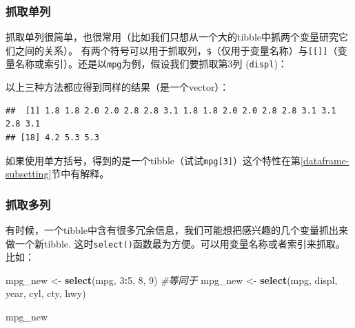 \documentclass[]{book}
\newenvironment{Shaded}{\begin{snugshade}}{\end{snugshade}}
\newcommand{\CommentTok}[1]{\textcolor[rgb]{0.56,0.35,0.01}{\textit{#1}}}
\newcommand{\DecValTok}[1]{\textcolor[rgb]{0.00,0.00,0.81}{#1}}
\newcommand{\KeywordTok}[1]{\textcolor[rgb]{0.13,0.29,0.53}{\textbf{#1}}}
\newcommand{\NormalTok}[1]{#1}
\newcommand{\OperatorTok}[1]{\textcolor[rgb]{0.81,0.36,0.00}{\textbf{#1}}}
\newcommand{\StringTok}[1]{\textcolor[rgb]{0.31,0.60,0.02}{#1}}
\begin{document}
\hypertarget{single-column}{%
\subsubsection{抓取单列}\label{single-column}}

抓取单列很简单，也很常用（比如我们只想从一个大的tibble中抓两个变量研究它们之间的关系）。 有两个符号可以用于抓取列，\texttt{\$}（仅用于变量名称）与\texttt{{[}{[}{]}{]}}（变量名称或索引）。还是以\texttt{mpg}为例，假设我们要抓取第3列 (\texttt{displ})：

\begin{Shaded}
\end{Shaded}

以上三种方法都应得到同样的结果（是一个vector）：

\begin{verbatim}
##  [1] 1.8 1.8 2.0 2.0 2.8 2.8 3.1 1.8 1.8 2.0 2.0 2.8 2.8 3.1 3.1 2.8 3.1
## [18] 4.2 5.3 5.3
\end{verbatim}

如果使用单方括号，得到的是一个tibble（试试\texttt{mpg{[}3{]}}）这个特性在第\ref{dataframe-subsetting}节中有解释。

\subsubsection{抓取多列}

有时候，一个tibble中含有很多冗余信息，我们可能想把感兴趣的几个变量抓出来做一个新tibble. 这时\texttt{select()}函数最为方便。可以用变量名称或者索引来抓取。比如：

\begin{Shaded}
\begin{Highlighting}[]
\NormalTok{mpg_new <-}\StringTok{ }\KeywordTok{select}\NormalTok{(mpg, }\DecValTok{3}\OperatorTok{:}\DecValTok{5}\NormalTok{, }\DecValTok{8}\NormalTok{, }\DecValTok{9}\NormalTok{)}
\CommentTok{#等同于}
\NormalTok{mpg_new <-}\StringTok{ }\KeywordTok{select}\NormalTok{(mpg, displ, year, cyl, cty, hwy)}

\NormalTok{mpg_new}
\end{Highlighting}
\end{Shaded}
\end{document}
